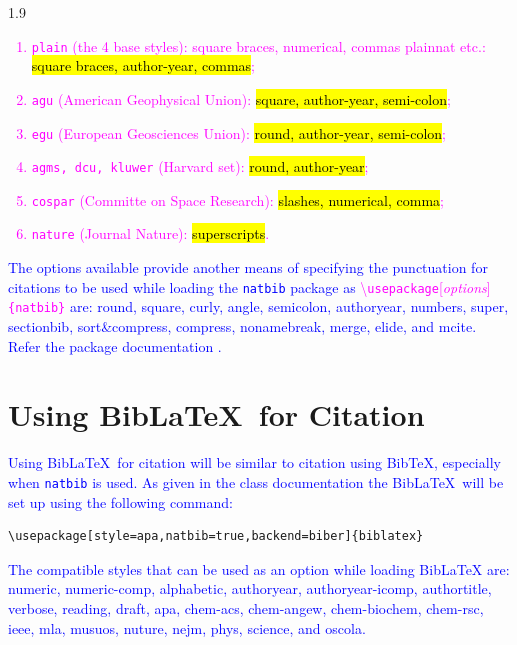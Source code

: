 \documentclass[phd]{ndsu-thesis-2022}
\newcommand\myspacing{1.9} %
\newcommand\italk[1]{\textcolor{blue}{#1}}  %
\newcommand\cmd[1]{\textbackslash\texttt{#1}}  %
\newcommand\vb[1]{\textcolor{blue}{\texttt{#1}}}%
\begin{document}
\begin{spacing}{\myspacing}
\vspace{-6ex}
\textcolor{magenta}{
\begin{enumerate}
\item \texttt{plain} (the 4 base styles): square braces, numerical, commas plainnat etc.: \hl{square braces, author-year, commas};
\item \texttt{agu} (American Geophysical Union): \hl{square, author-year, semi-colon};
\item \texttt{egu} (European Geosciences Union): \hl{round, author-year, semi-colon};
\item \texttt{agms, dcu, kluwer} (Harvard set): \hl{round, author-year};
\item \texttt{cospar} (Committe on Space Research): \hl{slashes, numerical, comma};
\item \texttt{nature} (Journal Nature): \hl{superscripts}.
\end{enumerate}
}

\italk{
The options available provide another means of specifying the punctuation
for citations to be used while loading the \texttt{natbib} package as \textcolor{magenta}{\cmd{usepackage}[\emph{options}]\texttt{\{natbib\}}} are: \textbullet\:round, \textbullet\:square, \textbullet\:curly, \textbullet\:angle, \textbullet\:semicolon, \textbullet\:authoryear, \textbullet\:numbers, \textbullet\:super, \textbullet\:sectionbib, \textbullet\:sort\&compress, \textbullet\:compress, \textbullet\:nonamebreak, \textbullet\:merge, \textbullet\:elide, and \textbullet\:mcite. Refer the package documentation \citep{daly2010natural}.  
}

\section{Using Bib\LaTeX\ for Citation}
\italk{Using Bib\LaTeX\ for citation will be similar to citation using BibTeX, especially when \vb{natbib} is used. As given in the class documentation the Bib\LaTeX\ will be set up using the following command:
}

\vspace{2ex}
{\singlespacing
\begin{verbatim}
\usepackage[style=apa,natbib=true,backend=biber]{biblatex}
\end{verbatim}
}

\italk{The compatible styles that can be used as an option while loading Bib\LaTeX\/ are: \textbullet\:numeric, \textbullet\:numeric-comp, \textbullet\:alphabetic, \textbullet\:authoryear, \textbullet\:authoryear-icomp, \textbullet\:authortitle, \textbullet\:verbose, \textbullet\:reading, \textbullet\:draft, \textbullet\:apa, \textbullet\:chem-acs, \textbullet\:chem-angew, \textbullet\:chem-biochem, \textbullet\:chem-rsc, \textbullet\:ieee, \textbullet\:mla, \textbullet\:musuos, \textbullet\:nuture, \textbullet\:nejm, \textbullet\:phys, \textbullet\:science, and \textbullet\:oscola.}



\end{spacing}
\end{document}
